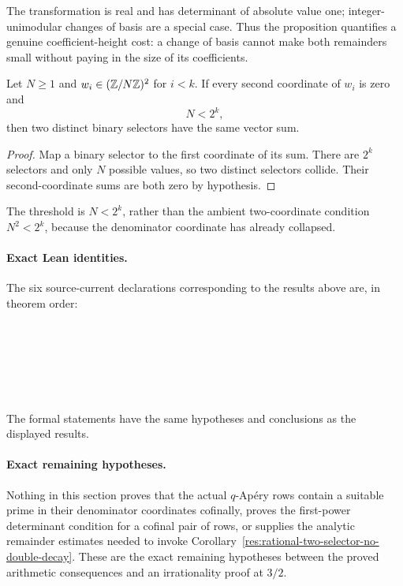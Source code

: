 \documentclass[11pt]{article}
\begin{document}
The transformation is real and has determinant of absolute value one;
integer-unimodular changes of basis are a special case.  Thus the proposition
quantifies a genuine coefficient-height cost: a change of basis cannot make
both remainders small without paying in the size of its coefficients.

\begin{proposition}
\label{res:zero-denominator-selector-collision}
Let \(N\ge1\) and \(w_i\in(\mathbb{Z}/N\mathbb{Z})^2\) for \(i<k\).  If every second
coordinate of \(w_i\) is zero and
\[
 N<2^k,
\]
then two distinct binary selectors have the same vector sum.
\end{proposition}

\begin{proof}
Map a binary selector to the first coordinate of its sum.  There are \(2^k\)
selectors and only \(N\) possible values, so two distinct selectors collide.
Their second-coordinate sums are both zero by hypothesis.
\end{proof}

The threshold is \(N<2^k\), rather than the ambient two-coordinate condition
\(N^2<2^k\), because the denominator coordinate has already collapsed.

\paragraph{Exact Lean identities.}
The six source-current declarations corresponding to the results above are,
in theorem order:
\begin{flushleft}\small
{}\\
\\
\\
\\
\\
\end{flushleft}
The formal statements have the same hypotheses and conclusions as the
displayed results.

\paragraph{Exact remaining hypotheses.}
\label{bdry:prime-support-remaining-hypotheses}
Nothing in this section proves that the actual \(q\)-Ap\'ery rows contain a
suitable prime in their denominator coordinates cofinally, proves the
first-power determinant condition for a cofinal pair of rows, or supplies the
analytic remainder estimates needed to invoke
Corollary~\ref{res:rational-two-selector-no-double-decay}.  These are the exact
remaining hypotheses between the proved arithmetic consequences and an
irrationality proof at \(3/2\).
\end{document}
